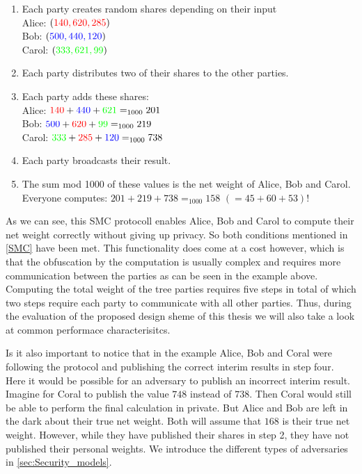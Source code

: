 \documentclass[12pt,a4paper]{scrartcl}				%
\begin{document}
\begin{enumerate}
	\item Each party creates random shares depending on their input\\
	Alice: $(\textcolor{red}{140,620,285})$\\
	Bob: $(\textcolor{blue}{500,440,120})$\\
	Carol: $(\textcolor{green}{333,621,99})$
	\item Each party distributes two of their shares to the other parties.
	\item Each party adds these shares: \\
	Alice: $\textcolor{red}{140}+\textcolor{blue}{440}+\textcolor{green}{621}=_{1000} 201$\\
	Bob: $\textcolor{blue}{500}+\textcolor{red}{620}+\textcolor{green}{99}=_{1000} 219$ \\
	Carol: $\textcolor{green}{333}+\textcolor{red}{285}+\textcolor{blue}{120}=_{1000} 738$
	\item Each party broadcasts their result. 
	\item The sum mod 1000 of these values is the net weight of Alice, Bob and Carol. Everyone computes: $201+219+738=_{1000} 158$ $(=45+60+53)!$
\end{enumerate}

As we can see, this SMC protocoll enables Alice, Bob and Carol to compute their net weight correctly without giving up privacy. So both conditions mentioned in \ref{SMC} have been met. This functionality does come at a cost however, which is that the obfuscation by the computation is usually complex and requires more communication between the parties as can be seen in the example above. Computing the total weight of the tree parties requires five steps in total of which two steps require each party to communicate with all other parties. Thus, during the evaluation of the proposed design sheme of this thesis we will also take a look at common performace characterisitcs.

Is it also important to notice that in the example Alice, Bob and Coral were following the protocol and publishing the correct interim results in step four. Here it would be possible for an adversary to publish an incorrect interim result. Imagine for Coral to publish the value $748$ instead of $738$. Then Coral would still be able to perform the final calculation in private. But Alice and Bob are left in the dark about their true net weight. Both will assume that $168$ is their true net weight. However, while they have published their shares in step 2, they have not published their personal weights. We introduce the different types of adversaries in \ref{sec:Security_models}.
\end{document}
